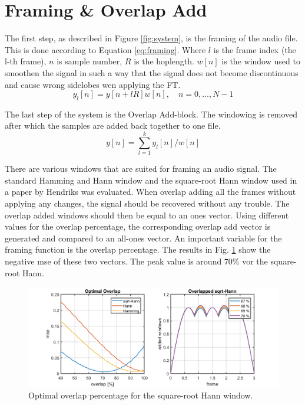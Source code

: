 \section{Framing \& Overlap Add} \label{sec:framing_overlap_add}

The first step, as described in Figure \ref{fig:system}, is the framing of the audio file. This is done according to Equation \ref{eq:framing}. Where $l$ is the frame index (the l-th frame), $n$ is sample number, $R$ is the hoplength. $w[n]$ is the window used to smoothen the signal in such a way that the signal does not become discontinuous and cause wrong sidelobes wen applying the FT.
\begin{equation}
  \label{eq:framing}
  y_{l}[n] = y[n + lR]w[n],\quad n=0,\hdots,N-1
\end{equation}

The last step of the system is the Overlap Add-block. The windowing is removed after which the samples are added back together to one file.
\begin{equation}
  \label{eq:overlap_add}
  y[n] =  \sum_{l=1}^{k} y_{l}[n]/w[n]
\end{equation}

There are various windows that are suited for framing an audio signal. The standard Hamming and Hann window and the square-root Hann window used in a paper by Hendriks\cite{Hendriks} was evaluated. When overlap adding all the frames without applying any changes, the signal should be recovered without any trouble. The overlap added windows should then be equal to an ones vector. Using different values for the overlap percentage, the corresponding overlap add vector is generated and compared to an all-ones vector. An important variable for the framing function is the overlap percentage.  The results in Fig. \ref{fig:opt_oa} show the negative mse of these two vectors. The peak value is around 70\% vor the square-root Hann.

\begin{figure}[h]
  \includegraphics[width=\textwidth]{images/optimal_overlap.png}
  \caption{Optimal overlap percentage for the square-root Hann window.}
  \label{fig:opt_oa}
\end{figure}
